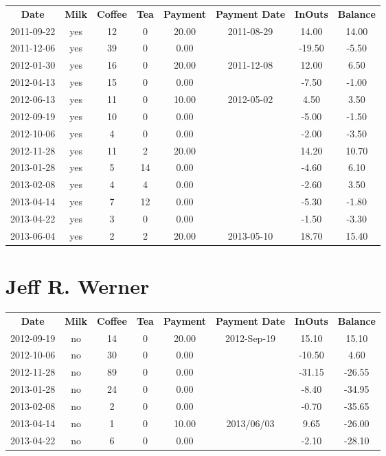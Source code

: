 \begin{center}
\begin{tabular}{cccccccc}
\textbf{Date} & \textbf{Milk} & \textbf{Coffee} & \textbf{Tea} & \textbf{Payment} & \textbf{Payment Date} & \textbf{InOuts} & \textbf{Balance} \\
2011-09-22 & yes & 12 &  0 & 20.00 & 2011-08-29 &  14.00 & 14.00\\ 
2011-12-06 & yes & 39 &  0 &  0.00 &  & -19.50 & -5.50\\ 
2012-01-30 & yes & 16 &  0 & 20.00 & 2011-12-08 &  12.00 &  6.50\\ 
2012-04-13 & yes & 15 &  0 &  0.00 &  &  -7.50 & -1.00\\ 
2012-06-13 & yes & 11 &  0 & 10.00 & 2012-05-02 &   4.50 &  3.50\\ 
2012-09-19 & yes & 10 &  0 &  0.00 &  &  -5.00 & -1.50\\ 
2012-10-06 & yes &  4 &  0 &  0.00 &  &  -2.00 & -3.50\\ 
2012-11-28 & yes & 11 &  2 & 20.00 &  &  14.20 & 10.70\\ 
2013-01-28 & yes &  5 & 14 &  0.00 &  &  -4.60 &  6.10\\ 
2013-02-08 & yes &  4 &  4 &  0.00 &  &  -2.60 &  3.50\\ 
2013-04-14 & yes &  7 & 12 &  0.00 &  &  -5.30 & -1.80\\ 
2013-04-22 & yes &  3 &  0 &  0.00 &  &  -1.50 & -3.30\\ 
2013-06-04 & yes &  2 &  2 & 20.00 & 2013-05-10 &  18.70 & 15.40
\end{tabular}
\end{center}

\section{Jeff R. Werner}

\begin{center}
\begin{tabular}{cccccccc}
\textbf{Date} & \textbf{Milk} & \textbf{Coffee} & \textbf{Tea} & \textbf{Payment} & \textbf{Payment Date} & \textbf{InOuts} & \textbf{Balance} \\
2012-09-19 & no & 14 & 0 & 20.00 & 2012-Sep-19 &  15.10 &  15.10\\ 
2012-10-06 & no & 30 & 0 &  0.00 &  & -10.50 &   4.60\\ 
2012-11-28 & no & 89 & 0 &  0.00 &  & -31.15 & -26.55\\ 
2013-01-28 & no & 24 & 0 &  0.00 &  &  -8.40 & -34.95\\ 
2013-02-08 & no &  2 & 0 &  0.00 &  &  -0.70 & -35.65\\ 
2013-04-14 & no &  1 & 0 & 10.00 & 2013/06/03 &   9.65 & -26.00\\ 
2013-04-22 & no &  6 & 0 &  0.00 &  &  -2.10 & -28.10
\end{tabular}
\end{center}

